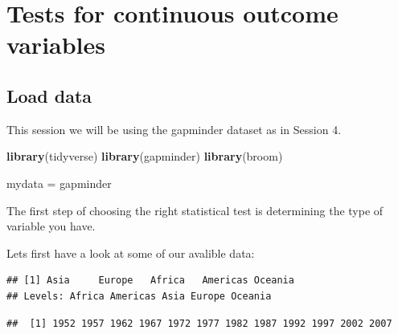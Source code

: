 \documentclass[]{book}
\makeatletter
\newenvironment{Shaded}{\begin{snugshade}}{\end{snugshade}}
\newcommand{\CommentTok}[1]{\textcolor[rgb]{0.56,0.35,0.01}{\textit{#1}}}
\newcommand{\KeywordTok}[1]{\textcolor[rgb]{0.13,0.29,0.53}{\textbf{#1}}}
\newcommand{\NormalTok}[1]{#1}
\newcommand{\OperatorTok}[1]{\textcolor[rgb]{0.81,0.36,0.00}{\textbf{#1}}}
\newcommand{\StringTok}[1]{\textcolor[rgb]{0.31,0.60,0.02}{#1}}
\newenvironment{kframe}{%
\medskip{}
\setlength{\fboxsep}{.8em}
 \def\at@end@of@kframe{}%
 \ifinner\ifhmode%
  \def\at@end@of@kframe{\end{minipage}}%
  \begin{minipage}{\columnwidth}%
 \fi\fi%
 \def\FrameCommand##1{\hskip\@totalleftmargin \hskip-\fboxsep
 \colorbox{shadecolor}{##1}\hskip-\fboxsep
     \hskip-\linewidth \hskip-\@totalleftmargin \hskip\columnwidth}%
 \MakeFramed {\advance\hsize-\width
   \@totalleftmargin\z@ \linewidth\hsize
   \@setminipage}}%
 {\par\unskip\endMakeFramed%
 \at@end@of@kframe}
\renewenvironment{Shaded}{\begin{kframe}}{\end{kframe}}
\theoremstyle{definition}
\theoremstyle{definition}
\theoremstyle{definition}
\theoremstyle{remark}
\makeatother
\begin{document}
\hypertarget{tests-for-continuous-outcome-variables}{%
\chapter{Tests for continuous outcome
variables}\label{tests-for-continuous-outcome-variables}}

\hypertarget{load-data}{%
\section{Load data}\label{load-data}}

This session we will be using the gapminder dataset as in Session 4.

\begin{Shaded}
\begin{Highlighting}[]
\KeywordTok{library}\NormalTok{(tidyverse) }
\KeywordTok{library}\NormalTok{(gapminder)}
\KeywordTok{library}\NormalTok{(broom)}

\NormalTok{mydata =}\StringTok{ }\NormalTok{gapminder}
\end{Highlighting}
\end{Shaded}

The first step of choosing the right statistical test is determining the
type of variable you have.

Lets first have a look at some of our avalible data:

\begin{Shaded}
\end{Shaded}

\begin{verbatim}
## [1] Asia     Europe   Africa   Americas Oceania 
## Levels: Africa Americas Asia Europe Oceania
\end{verbatim}

\begin{Shaded}
\end{Shaded}

\begin{verbatim}
##  [1] 1952 1957 1962 1967 1972 1977 1982 1987 1992 1997 2002 2007
\end{verbatim}
\end{document}
